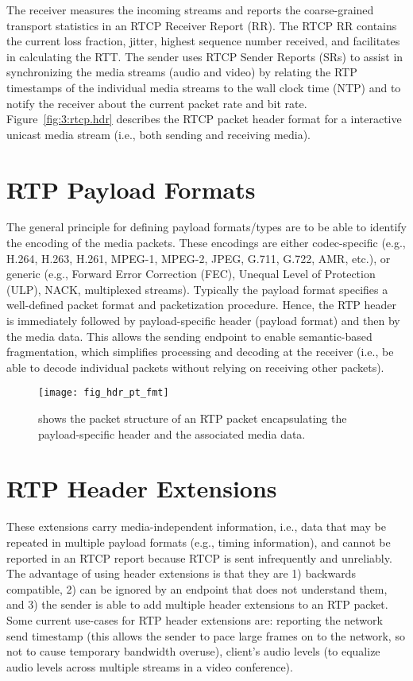 The receiver measures the incoming streams and reports the coarse-grained
transport statistics in an RTCP Receiver Report (RR). The RTCP RR contains the
current loss fraction, jitter, highest sequence number received, and
facilitates in calculating the RTT. The sender uses RTCP Sender Reports (SRs)
to assist in synchronizing the media streams (audio and video) by relating the
RTP timestamps of the individual media streams to the wall clock time (NTP)
and to notify the receiver about the current packet rate and bit rate.
Figure~\ref{fig:3:rtcp.hdr} describes the RTCP packet header format for a
interactive unicast media stream (i.e., both sending and receiving media).

\section{RTP Payload Formats}

The general principle for defining payload formats/types are to be able to
identify the encoding of the media packets. These encodings are either
codec-specific (e.g., H.264, H.263, H.261, MPEG-1, MPEG-2, JPEG, G.711, G.722,
AMR, etc.), or generic (e.g., Forward Error Correction (FEC), Unequal Level of
Protection (ULP), NACK, multiplexed streams). Typically the payload format
specifies a well-defined packet format and packetization procedure. Hence, the
RTP header is immediately followed by payload-specific header (payload format)
and then by the media data. This allows the sending endpoint to enable
semantic-based fragmentation, which simplifies processing and decoding at the
receiver (i.e., be able to decode individual packets without relying on
receiving other packets).

\begin{figure}[!h]
\centerline{\texttt{[image: fig\_hdr\_pt\_fmt]}}
\caption{shows the packet structure of an RTP packet encapsulating the
payload-specific header and the associated media data.}
\label{fig:3:pt.fmt}
\end{figure}

\section{RTP Header Extensions}

These extensions carry media-independent information, i.e., data that may be
repeated in multiple payload formats (e.g., timing information), and cannot be
reported in an RTCP report because RTCP is sent infrequently and unreliably.
The advantage of using header extensions is that they are 1) backwards
compatible, 2) can be ignored by an endpoint that does not understand them,
and 3) the sender is able to add multiple header extensions to an RTP packet.
Some current use-cases for RTP header extensions are: reporting the network
send timestamp (this allows the sender to pace large frames on to the network,
so not to cause temporary bandwidth overuse), client's audio levels (to
equalize audio levels across multiple streams in a video conference).

